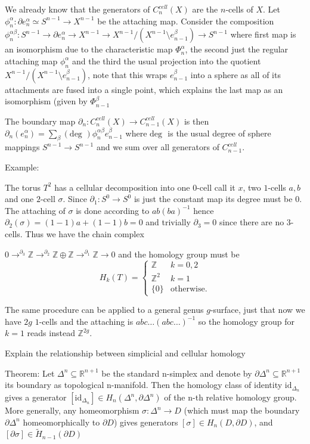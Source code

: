 We already know that the generators of \(C^{cell}_n(X)\) are the \( n \)-cells of \( X \).
Let \( \phi^\alpha_n : \partial e^\alpha_n \simeq S^{n-1} \to X^{n-1} \) be the attaching map.
Consider the composition
\( \phi^{\alpha \beta}_n : S^{n-1} \to \partial e^\alpha_n \to X^{n-1} \to X^{n-1} / (X^{n-1} \setminus e^\beta_{n-1}) \to S^{n-1} \)
where first map is an isomorphism due to the characteristic map \( \Phi^\alpha_n \), the second just the regular attaching map \( \phi^\alpha_n \)
and the third the usual projection into the quotient \( X^{n-1} / (X^{n-1} \setminus e^\beta_{n-1}) \), note that this wraps \( e^\beta_{n-1} \)
into a sphere as all of its attachments are fused into a single point, which explains the last map as an isomorphism (given by \( \Phi^\beta_{n-1} \)

The boundary map \( \partial_n : C^{cell}_n(X) \to C^{cell}_{n-1}(X)\) 
is then
\( \partial_n(e^\alpha_n) = \sum_\beta (\text{deg }) \phi_n^{\alpha\beta} e^\beta_{n-1} \)
where \( \text{deg } \) is the usual degree of sphere mappings \( S^{n-1} \to S^{n-1} \) and we sum
over all generators of \( C^{cell}_{n-1} \).

Example:

The torus \( T^2 \) has a cellular decomposition into one \( 0 \)-cell call it \( x \), two \( 1 \)-cells \( a,b \) and one \( 2 \)-cell \( \sigma \).
Since \( \partial_1 : S^{0} \to S^0 \) is just the constant map its degree must be \( 0 \). 
The attaching of \( \sigma \) is done according to \( ab(ba)^{-1} \) hence \( \partial_2(\sigma) = (1 - 1)a + (1 - 1)b = 0 \) and trivially
\( \partial_3 = 0 \) since there are no \( 3 \)-cells. Thus we have the chain complex

\( 0 \to^{\partial_3} \mathbb{Z} \to^{\partial_2} \mathbb{Z} \oplus \mathbb{Z} \to^{\partial_1} \mathbb{Z} \to 0\)
and the homology group must be
\[
H_k(T) = \begin{cases} 
\mathbb{Z} & k = 0,2 \\ \mathbb{Z}^2 & k = 1 \\ \{0\} & \text{otherwise.} 
\end{cases}
\]

The same procedure can be applied to a general genus \( g \)-surface, just that now we have \( 2g \) \(1\)-cells and the attaching is \( abc\dots(abc\dots)^{-1} \)
so the homology group for \( k=1 \) reads instead \( \mathbb{Z}^{2g} \).


Explain the relationship between simplicial and cellular homology

Theorem:
Let \(\Delta^n \subseteq \mathbb{R}^{n+1}\) be the standard n-simplex and denote by \(\partial \Delta^n \subseteq \mathbb{R}^{n+1}\) its
boundary as topological n-manifold. Then the homology class of identity \(\text{id}_{\Delta_n}\) gives a generator
\([\text{id}_{\Delta_n}] \in H_n(\Delta^n , \partial \Delta^n )\) of the n-th relative homology group.
More generally, any homeomorphism \(\sigma : \Delta^n \to D\) 
(which must map the boundary \(\partial \Delta^n\) homeomorphically to \(\partial D\)) gives generators \([\sigma] \in H_n(D, \partial D)\), and 
\([\partial \sigma] \in \tilde{H}_{n−1}(\partial D)\)

